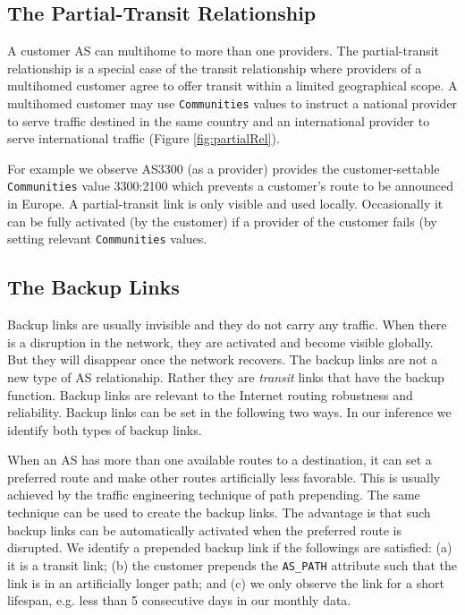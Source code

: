 \documentclass[conference]{IEEEtran}
\begin{document}
\subsection{The Partial-Transit Relationship} 

A customer AS  can multihome to more than one providers. 
The partial-transit relationship is a special case of the transit relationship where  providers of a multihomed customer agree to offer transit within  a limited geographical scope. 
A multihomed customer may use  {\tt Communities} values  to instruct a national provider to serve  traffic  destined in the same country and an international provider to serve international traffic  (Figure \ref{fig:partialRel}). 

For example we observe AS3300 (as a provider) provides the customer-settable {\tt Communities}  value 3300:2100 which prevents a customer's route to be announced in Europe.
A partial-transit link is only visible and used locally. Occasionally it can be fully activated (by the customer) if a provider of the customer fails (by setting relevant {\tt Communities} values. 

\subsection{The Backup Links} 

Backup links  are usually invisible and they do not carry any traffic. When there is a disruption in the network, they are activated and  become  visible globally. But they will disappear once the network recovers. The backup links are not a new type of AS relationship. Rather they are {\em transit} links that have the backup function. Backup links are relevant to the Internet routing robustness and reliability. Backup links can be set in the following two ways. In our inference we identify both types of backup links.

When an AS has more than one available routes to a destination, it can set a preferred route and make other routes artificially less favorable.   This is usually achieved by the traffic engineering technique of path prepending. The same technique can be used to create the 
 backup links. The advantage is that such backup links can be automatically activated when the preferred route is disrupted. We identify a prepended backup link if the followings are satisfied: (a) it is a transit link; (b) the customer prepends the {\tt AS\_PATH} attribute such that the link is in an artificially longer path; and (c) we only observe the link for a short lifespan, e.g. less than 5 consecutive days in our monthly data.  
 
\end{document}
